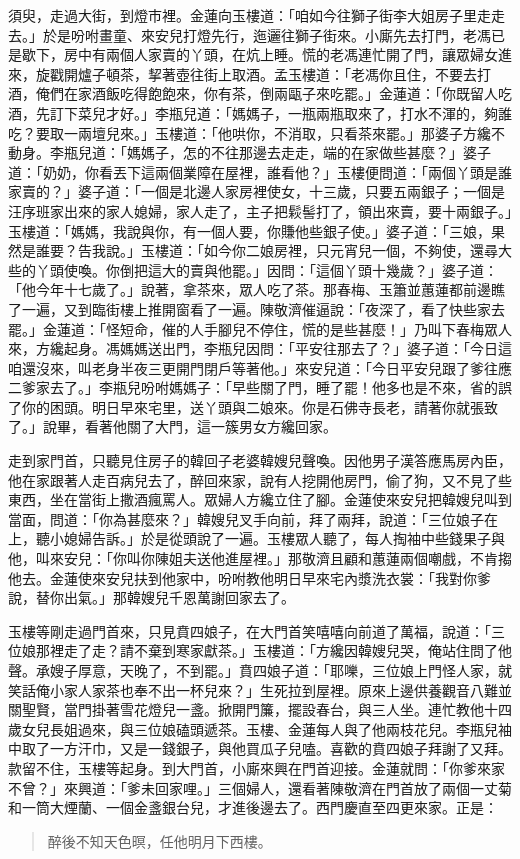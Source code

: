 須臾，走過大街，到燈市裡。金蓮向玉樓道：「咱如今往獅子街李大姐房子里走走去。」於是吩咐畫童、來安兒打燈先行，迤邐往獅子街來。小廝先去打門，老馮已是歇下，房中有兩個人家賣的丫頭，在炕上睡。慌的老馮連忙開了門，讓眾婦女進來，旋戳開爐子頓茶，挈著壺往街上取酒。孟玉樓道：「老馮你且住，不要去打酒，俺們在家酒飯吃得飽飽來，你有茶，倒兩甌子來吃罷。」金蓮道：「你既留人吃酒，先訂下菜兒才好。」李瓶兒道：「媽媽子，一瓶兩瓶取來了，打水不渾的，夠誰吃？要取一兩壇兒來。」玉樓道：「他哄你，不消取，只看茶來罷。」那婆子方纔不動身。李瓶兒道：「媽媽子，怎的不往那邊去走走，端的在家做些甚麼？」婆子道：「奶奶，你看丟下這兩個業障在屋裡，誰看他？」玉樓便問道：「兩個丫頭是誰家賣的？」婆子道：「一個是北邊人家房裡使女，十三歲，只要五兩銀子；一個是汪序班家出來的家人媳婦，家人走了，主子把鬏髻打了，領出來賣，要十兩銀子。」玉樓道：「媽媽，我說與你，有一個人要，你賺他些銀子使。」婆子道：「三娘，果然是誰要？告我說。」玉樓道：「如今你二娘房裡，只元宵兒一個，不夠使，還尋大些的丫頭使喚。你倒把這大的賣與他罷。」因問：「這個丫頭十幾歲？」婆子道：「他今年十七歲了。」說著，拿茶來，眾人吃了茶。那春梅、玉簫並蕙蓮都前邊瞧了一遍，又到臨街樓上推開窗看了一遍。陳敬濟催逼說：「夜深了，看了快些家去罷。」金蓮道：「怪短命，催的人手腳兒不停住，慌的是些甚麼！」乃叫下春梅眾人來，方纔起身。馮媽媽送出門，李瓶兒因問：「平安往那去了？」婆子道：「今日這咱還沒來，叫老身半夜三更開門閉戶等著他。」來安兒道：「今日平安兒跟了爹往應二爹家去了。」李瓶兒吩咐媽媽子：「早些關了門，睡了罷！他多也是不來，省的誤了你的困頭。明日早來宅里，送丫頭與二娘來。你是石佛寺長老，請著你就張致了。」說畢，看著他關了大門，這一簇男女方纔回家。

走到家門首，只聽見住房子的韓回子老婆韓嫂兒聲喚。因他男子漢答應馬房內臣，他在家跟著人走百病兒去了，醉回來家，說有人挖開他房門，偷了狗，又不見了些東西，坐在當街上撒酒瘋罵人。眾婦人方纔立住了腳。金蓮使來安兒把韓嫂兒叫到當面，問道：「你為甚麼來？」韓嫂兒叉手向前，拜了兩拜，說道：「三位娘子在上，聽小媳婦告訴。」於是從頭說了一遍。玉樓眾人聽了，每人掏袖中些錢果子與他，叫來安兒：「你叫你陳姐夫送他進屋裡。」那敬濟且顧和蕙蓮兩個嘲戲，不肯搊他去。金蓮使來安兒扶到他家中，吩咐教他明日早來宅內漿洗衣裳：「我對你爹說，替你出氣。」那韓嫂兒千恩萬謝回家去了。

玉樓等剛走過門首來，只見賁四娘子，在大門首笑嘻嘻向前道了萬福，說道：「三位娘那裡走了走？請不棄到寒家獻茶。」玉樓道：「方纔因韓嫂兒哭，俺站住問了他聲。承嫂子厚意，天晚了，不到罷。」賁四娘子道：「耶嚛，三位娘上門怪人家，就笑話俺小家人家茶也奉不出一杯兒來？」生死拉到屋裡。原來上邊供養觀音八難並關聖賢，當門掛著雪花燈兒一盞。掀開門簾，擺設春台，與三人坐。連忙教他十四歲女兒長姐過來，與三位娘磕頭遞茶。玉樓、金蓮每人與了他兩枝花兒。李瓶兒袖中取了一方汗巾，又是一錢銀子，與他買瓜子兒嗑。喜歡的賁四娘子拜謝了又拜。款留不住，玉樓等起身。到大門首，小廝來興在門首迎接。金蓮就問：「你爹來家不曾？」來興道：「爹未回家哩。」三個婦人，還看著陳敬濟在門首放了兩個一丈菊和一筒大煙蘭、一個金盞銀台兒，才進後邊去了。西門慶直至四更來家。正是：
\begin{quote}
醉後不知天色暝，任他明月下西樓。
\end{quote}

